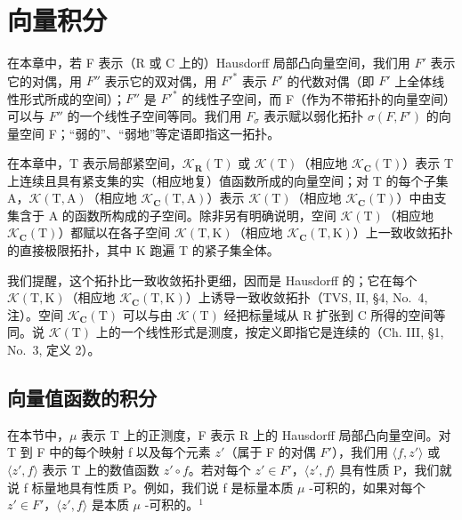 \chapter{向量积分}

在本章中，若 F 表示（R 或 C 上的）Hausdorff 局部凸向量空间，我们用 \(F'\) 表示它的对偶，用 \(F''\) 表示它的双对偶，用 \(F'^*\) 表示 \(F'\) 的代数对偶（即 \(F'\) 上全体线性形式所成的空间）；\(F''\) 是 \(F'^*\) 的线性子空间，而 F（作为不带拓扑的向量空间）可以与 \(F''\) 的一个线性子空间等同。我们用 \(F_\sigma\) 表示赋以弱化拓扑 \(\sigma(F, F')\) 的向量空间 F；“弱的”、“弱地”等定语即指这一拓扑。

在本章中，T 表示局部紧空间，\(\mathcal{K}_{\mathbf{R}}(\mathrm{T})\) 或 \(\mathcal{K}(\mathrm{T})\)（相应地 \(\mathcal{K}_{\mathbf{C}}(\mathrm{T})\)）表示 T 上连续且具有紧支集的实（相应地复）值函数所成的向量空间；对 T 的每个子集 A，\(\mathcal{K}(\mathrm{T},\mathrm{A})\)（相应地 \(\mathcal{K}_{\mathbf{C}}(\mathrm{T},\mathrm{A})\)）表示 \(\mathcal{K}(\mathrm{T})\)（相应地 \(\mathcal{K}_{\mathbf{C}}(\mathrm{T})\)）中由支集含于 A 的函数所构成的子空间。除非另有明确说明，空间 \(\mathcal{K}(\mathrm{T})\)（相应地 \(\mathcal{K}_{\mathbf{C}}(\mathrm{T})\)）都赋以在各子空间 \(\mathcal{K}(\mathrm{T},\mathrm{K})\)（相应地 \(\mathcal{K}_{\mathbf{C}}(\mathrm{T},\mathrm{K})\)）上一致收敛拓扑的直接极限拓扑，其中 K 跑遍 T 的紧子集全体。

我们提醒，这个拓扑比一致收敛拓扑更细，因而是 Hausdorff 的；它在每个 \(\mathcal{K}(\mathrm{T},\mathrm{K})\)（相应地 \(\mathcal{K}_{\mathbf{C}}(\mathrm{T},\mathrm{K})\)）上诱导一致收敛拓扑（TVS, II, §4, No.~4, 注）。空间 \(\mathcal{K}_{\mathbf{C}}(\mathrm{T})\) 可以与由 \(\mathcal{K}(\mathrm{T})\) 经把标量域从 R 扩张到 C 所得的空间等同。说 \(\mathcal{K}(\mathrm{T})\) 上的一个线性形式是测度，按定义即指它是连续的（Ch. III, §1, No.~3, 定义 2）。

\section{向量值函数的积分}

在本节中，\(\mu\) 表示 T 上的正测度，F 表示 R 上的 Hausdorff 局部凸向量空间。对 T 到 F 中的每个映射 f 以及每个元素 \(z'\)（属于 F 的对偶 \(F'\)），我们用 \(\langle f, z' \rangle\) 或 \(\langle z', f \rangle\) 表示 T 上的数值函数 \(z' \circ f\)。若对每个 \(z' \in F'\)，\(\langle z', f \rangle\) 具有性质 P，我们就说 f 标量地具有性质 P。例如，我们说 f 是标量本质 \(\mu\) -可积的，如果对每个 \(z' \in F'\)，\(\langle z', f \rangle\) 是本质 \(\mu\) -可积的。\(^{1}\)

